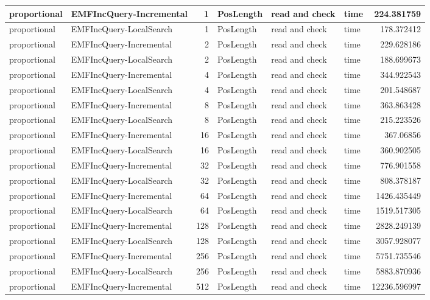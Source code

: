 \begin{table}
\begin{tabular}{| l | l | r | l | l | l | r |}
proportional & EMFIncQuery-Incremental & 1 & PosLength & read and check & time & 224.381759\\\hline
proportional & EMFIncQuery-LocalSearch & 1 & PosLength & read and check & time & 178.372412\\\hline
proportional & EMFIncQuery-Incremental & 2 & PosLength & read and check & time & 229.628186\\\hline
proportional & EMFIncQuery-LocalSearch & 2 & PosLength & read and check & time & 188.699673\\\hline
proportional & EMFIncQuery-Incremental & 4 & PosLength & read and check & time & 344.922543\\\hline
proportional & EMFIncQuery-LocalSearch & 4 & PosLength & read and check & time & 201.548687\\\hline
proportional & EMFIncQuery-Incremental & 8 & PosLength & read and check & time & 363.863428\\\hline
proportional & EMFIncQuery-LocalSearch & 8 & PosLength & read and check & time & 215.223526\\\hline
proportional & EMFIncQuery-Incremental & 16 & PosLength & read and check & time & 367.06856\\\hline
proportional & EMFIncQuery-LocalSearch & 16 & PosLength & read and check & time & 360.902505\\\hline
proportional & EMFIncQuery-Incremental & 32 & PosLength & read and check & time & 776.901558\\\hline
proportional & EMFIncQuery-LocalSearch & 32 & PosLength & read and check & time & 808.378187\\\hline
proportional & EMFIncQuery-Incremental & 64 & PosLength & read and check & time & 1426.435449\\\hline
proportional & EMFIncQuery-LocalSearch & 64 & PosLength & read and check & time & 1519.517305\\\hline
proportional & EMFIncQuery-Incremental & 128 & PosLength & read and check & time & 2828.249139\\\hline
proportional & EMFIncQuery-LocalSearch & 128 & PosLength & read and check & time & 3057.928077\\\hline
proportional & EMFIncQuery-Incremental & 256 & PosLength & read and check & time & 5751.735546\\\hline
proportional & EMFIncQuery-LocalSearch & 256 & PosLength & read and check & time & 5883.870936\\\hline
proportional & EMFIncQuery-Incremental & 512 & PosLength & read and check & time & 12236.596997\\\hline

\end{tabular}
\end{table}
